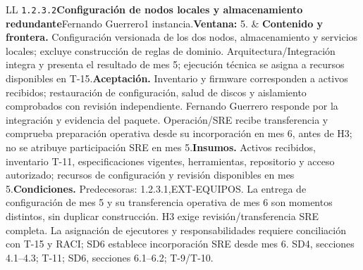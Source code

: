 \begin{longtable}{L{\tabcolsep\relax}L{\tabcolsep\relax}}
\texttt{1.\allowbreak{}2.\allowbreak{}3.\allowbreak{}2}\newline{}\textbf{Configuración de nodos locales y almacenamiento redundante}\newline{}Fernando Guerrero\newline{}1 instancia.\newline{}\textbf{Ventana:} 5. & \textbf{Contenido y frontera.} Configuración versionada de los dos nodos, almacenamiento y servicios locales; excluye construcción de reglas de dominio. Arquitectura/Integración integra y presenta el resultado de mes 5; ejecución técnica se asigna a recursos disponibles en T-15.\newline{}\textbf{Aceptación.} Inventario y firmware corresponden a activos recibidos; restauración de configuración, salud de discos y aislamiento comprobados con revisión independiente. Fernando Guerrero responde por la integración y evidencia del paquete. Operación/SRE recibe transferencia y comprueba preparación operativa desde su incorporación en mes 6, antes de H3; no se atribuye participación SRE en mes 5.\newline{}\textbf{Insumos.} Activos recibidos, inventario T-11, especificaciones vigentes, herramientas, repositorio y acceso autorizado; recursos de configuración y revisión disponibles en mes 5.\newline{}\textbf{Condiciones.} Predecesoras: 1.2.3.1,EXT-EQUIPOS. La entrega de configuración de mes 5 y su transferencia operativa de mes 6 son momentos distintos, sin duplicar construcción. H3 exige revisión/transferencia SRE completa. La asignación de ejecutores y responsabilidades requiere conciliación con T-15 y RACI; SD6 establece incorporación SRE desde mes 6. SD4, secciones 4.1--4.3; T-11; SD6, secciones 6.1--6.2; T-9/T-10.\\\hline

\end{longtable}

